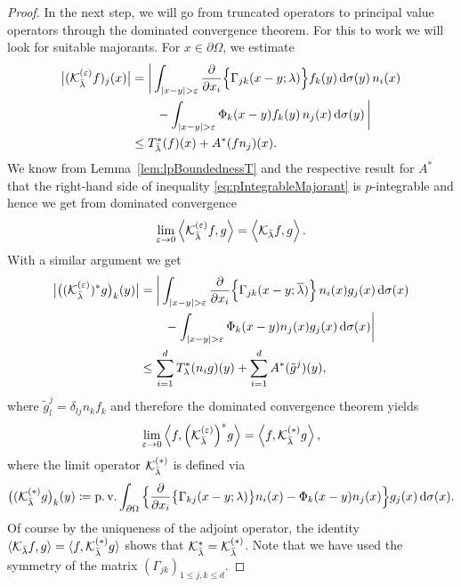 \begin{proof}
  In the next step, we will go from truncated operators to principal value operators through the dominated convergence theorem. 
  For this to work we will look for suitable majorants.
  For $x \in \partial\Omega$, we estimate
  \begin{align}
    \big|(\mathcal{K}_{\bar\lambda}^{(\varepsilon)}f)_j (x)\big|
    &= \bigg| \int_{|x - y| > \varepsilon} \frac{\partial}{\partial x_i} \Big\{ \Gamma_{jk}(x - y; \lambda) \Big\} f_k(y) \, {\operatorname{d}\!{\sigma}}(y) \, n_i(x)  \nonumber\\
    &\qquad - \int_{|x - y| > \varepsilon} \Phi_k(x - y) f_k(y)\, n_j(x) \, {\operatorname{d}\!{\sigma}}(y)\, \bigg| \nonumber\\
    \label{eq:pIntegrableMajorant}
    &\leq T_{\bar\lambda}^*(f)(x) + A^*(fn_j)(x).
  \end{align}
  We know from Lemma~\ref{lem:lpBoundednessT} and the respective result for $A^*$ that the right-hand side of inequality \eqref{eq:pIntegrableMajorant} is $p$-integrable and hence we get from dominated convergence
  \begin{align*}
    \lim_{\varepsilon \to 0} \Big\langle \mathcal{K}_{\bar\lambda}^{(\varepsilon)} f, g \Big\rangle = \Big\langle \mathcal{K}_{\bar\lambda} f, g \Big\rangle\,.
  \end{align*}
  With a similar argument we get
  \begin{align*}
    \big| \big((\mathcal{K}_{\bar \lambda}^{(\varepsilon)})^* g \big)_k(y) \big|
    &=
    \bigg| \int_{|x - y| > \varepsilon} \frac{\partial}{\partial x_i} \Big\{ \Gamma_{jk}(x - y; \overline\lambda) \Big\} \, n_i(x) g_j(x) \, {\operatorname{d}\!{\sigma}}(x)\\
    &\qquad - \int_{|x - y| > \varepsilon} \Phi_k(x - y) n_j(x) g_j(x)   \, {\operatorname{d}\!{\sigma}}(x) \bigg| \\
    &\leq \sum_{i = 1}^d T_\lambda^*(n_i g)(y)  + \sum_{i = 1}^d A^*(\tilde g^j)(y),
  \end{align*}
  where $\tilde g^j_l = \delta_{lj} n_k f_k$ and therefore the dominated convergence theorem yields
  \begin{align*}
    \lim_{\varepsilon \to 0} \Big\langle f, {\Big(\mathcal{K}_{\bar\lambda}^{(\varepsilon)}}\Big)^* g \Big\rangle = \Big\langle f,\mathcal{K}_{\bar\lambda}^{(*)}  g \Big\rangle\,,
  \end{align*}
  where the limit operator $\mathcal{K}_{\bar\lambda}^{(*)}$ is defined via
  \begin{align*}
    \big( ( \mathcal{K}_{\bar\lambda}^{(*)} g\big)_k(y)
    \coloneqq \operatorname{p. v.}\int_{\partial\Omega} \Big\{ \frac{\partial}{\partial x_i} \big\{ \Gamma_{kj}(x - y; \lambda)\big\} n_i(x) - \Phi_k(x - y) n_j(x) \Big\} g_j(x) \, {\operatorname{d}\!{\sigma}}(x). 
  \end{align*}
  Of course by the uniqueness of the adjoint operator, the identity $\langle \mathcal{K}_{\bar\lambda} f, g \rangle = \langle f, \mathcal{K}_{\bar\lambda}^{(*)} g \rangle$ shows that $\mathcal{K}_{\bar\lambda}^* = \mathcal{K}_{\bar\lambda}^{(*)}$.
  Note that we have used the symmetry of the matrix $(\Gamma_{jk})_{1 \leq j,k \leq d}$.


\end{proof}
